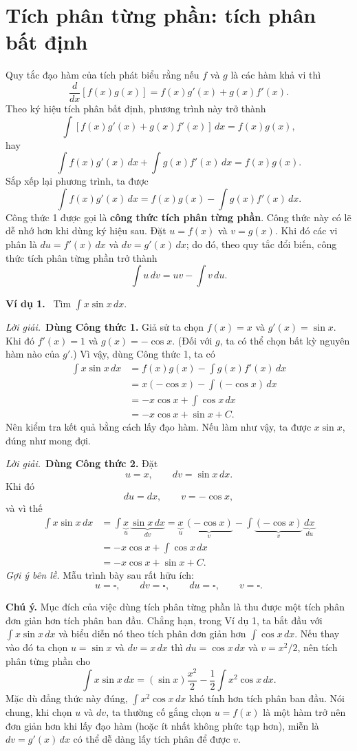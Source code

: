 \documentclass[12pt,a4paper]{article}
\newcommand{\ex}[1]{\par\medskip\noindent\textbf{Ví dụ #1.}\ }
\newcommand{\sol}{\par\nopagebreak[4]\noindent\textit{Lời giải.}\ }
\begin{document}
\section*{Tích phân từng phần: tích phân bất định}
Quy tắc đạo hàm của tích phát biểu rằng nếu $f$ và $g$ là các hàm khả vi thì
\[\frac{d}{dx}[f(x)g(x)]=f(x)g'(x)+g(x)f'(x).\]
Theo ký hiệu tích phân bất định, phương trình này trở thành
\[\int[f(x)g'(x)+g(x)f'(x)]\,dx=f(x)g(x),\]
hay
\[\int f(x)g'(x)\,dx+\int g(x)f'(x)\,dx=f(x)g(x).\]
Sắp xếp lại phương trình, ta được
\begin{equation}\int f(x)g'(x)\,dx=f(x)g(x)-\int g(x)f'(x)\,dx.\tag{1}\end{equation}
Công thức 1 được gọi là \textbf{công thức tích phân từng phần}. Công thức này có lẽ dễ nhớ hơn khi dùng ký hiệu sau. Đặt $u=f(x)$ và $v=g(x)$. Khi đó các vi phân là $du=f'(x)\,dx$ và $dv=g'(x)\,dx$; do đó, theo quy tắc đổi biến, công thức tích phân từng phần trở thành
\begin{equation}\int u\,dv=uv-\int v\,du.\tag{2}\end{equation}

\ex{1} Tìm $\displaystyle\int x\sin x\,dx$.
\sol \textbf{Dùng Công thức 1.} Giả sử ta chọn $f(x)=x$ và $g'(x)=\sin x$. Khi đó $f'(x)=1$ và $g(x)=-\cos x$. (Đối với $g$, ta có thể chọn bất kỳ nguyên hàm nào của $g'$.) Vì vậy, dùng Công thức 1, ta có
\begin{align*}
\int x\sin x\,dx&=f(x)g(x)-\int g(x)f'(x)\,dx\\
&=x(-\cos x)-\int(-\cos x)\,dx\\
&=-x\cos x+\int\cos x\,dx\\
&=-x\cos x+\sin x+C.
\end{align*}
Nên kiểm tra kết quả bằng cách lấy đạo hàm. Nếu làm như vậy, ta được $x\sin x$, đúng như mong đợi.

\sol \textbf{Dùng Công thức 2.} Đặt
\[u=x,\qquad dv=\sin x\,dx.\]
Khi đó
\[du=dx,\qquad v=-\cos x,\]
và vì thế
\begin{align*}
\int x\sin x\,dx&=\int\underbrace{x}_{u}\,\underbrace{\sin x\,dx}_{dv}
=\underbrace{x}_{u}\,\underbrace{(-\cos x)}_{v}-\int\underbrace{(-\cos x)}_{v}\,\underbrace{dx}_{du}\\
&=-x\cos x+\int\cos x\,dx\\
&=-x\cos x+\sin x+C.
\end{align*}
\textit{Gợi ý bên lề.} Mẫu trình bày sau rất hữu ích:
\[u=\square,\qquad dv=\square,\qquad du=\square,\qquad v=\square.\]

\textbf{Chú ý.} Mục đích của việc dùng tích phân từng phần là thu được một tích phân đơn giản hơn tích phân ban đầu. Chẳng hạn, trong Ví dụ 1, ta bắt đầu với $\int x\sin x\,dx$ và biểu diễn nó theo tích phân đơn giản hơn $\int\cos x\,dx$. Nếu thay vào đó ta chọn $u=\sin x$ và $dv=x\,dx$ thì $du=\cos x\,dx$ và $v=x^2/2$, nên tích phân từng phần cho
\[\int x\sin x\,dx=(\sin x)\frac{x^2}{2}-\frac12\int x^2\cos x\,dx.\]
Mặc dù đẳng thức này đúng, $\int x^2\cos x\,dx$ khó tính hơn tích phân ban đầu. Nói chung, khi chọn $u$ và $dv$, ta thường cố gắng chọn $u=f(x)$ là một hàm trở nên đơn giản hơn khi lấy đạo hàm (hoặc ít nhất không phức tạp hơn), miễn là $dv=g'(x)\,dx$ có thể dễ dàng lấy tích phân để được $v$.
\end{document}
